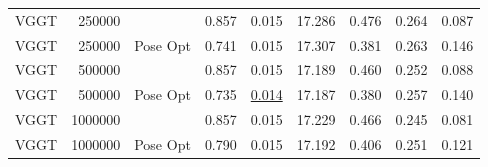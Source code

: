\begin{table}[H]
\begin{tabular}{lrlrrrrrr}
VGGT & 250000 &  & 0.857 & 0.015 & 17.286 & 0.476 & 0.264 & 0.087 \\
VGGT & 250000 & Pose Opt & 0.741 & 0.015 & 17.307 & 0.381 & 0.263 & 0.146 \\
VGGT & 500000 &  & 0.857 & 0.015 & 17.189 & 0.460 & 0.252 & 0.088 \\
VGGT & 500000 & Pose Opt & 0.735 & \underline{0.014} & 17.187 & 0.380 & 0.257 & 0.140 \\
VGGT & 1000000 &  & 0.857 & 0.015 & 17.229 & 0.466 & 0.245 & 0.081 \\
VGGT & 1000000 & Pose Opt & 0.790 & 0.015 & 17.192 & 0.406 & 0.251 & 0.121 \\
\bottomrule
\end{tabular}
\end{table}
